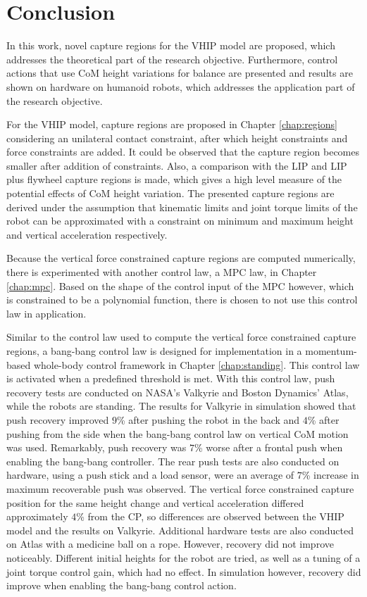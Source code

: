 %
\chapter{Conclusion}\label{chap:conclusion}
In this work, novel capture regions for the \ac{VHIP} model are proposed, which addresses the theoretical part of the research objective. Furthermore, control actions that use \ac{CoM} height variations for balance are presented and results are shown on hardware on humanoid robots, which addresses the application part of the research objective. 

For the \ac{VHIP} model, capture regions are proposed in Chapter \ref{chap:regions} considering an unilateral contact constraint, after which height constraints and force constraints are added. It could be observed that the capture region becomes smaller after addition of constraints. Also, a comparison with the \ac{LIP} and \ac{LIP} plus flywheel capture regions is made, which gives a high level measure of the potential effects of \ac{CoM} height variation. The presented capture regions are derived under the assumption that kinematic limits and joint torque limits of the robot can be approximated with a constraint on minimum and maximum height and vertical acceleration respectively. 

Because the vertical force constrained capture regions are computed numerically, there is experimented with another control law, a \ac{MPC} law, in Chapter \ref{chap:mpc}. Based on the shape of the control input of the \ac{MPC} however, which is constrained to be a polynomial function, there is chosen to not use this control law in application.

Similar to the control law used to compute the vertical force constrained capture regions, a bang-bang control law is designed for implementation in a momentum-based whole-body control framework in Chapter \ref{chap:standing}. This control law is activated when a predefined threshold is met. With this control law, push recovery tests are conducted on NASA's Valkyrie and Boston Dynamics' Atlas, while the robots are standing. The results for Valkyrie in simulation showed that push recovery improved $9$\% after pushing the robot in the back and $4$\% after pushing from the side when the bang-bang control law on vertical \ac{CoM} motion was used. Remarkably, push recovery was $7$\% worse after a frontal push when enabling the bang-bang controller. The rear push tests are also conducted on hardware, using a push stick and a load sensor, were an average of $7$\% increase in maximum recoverable push was observed. The vertical force constrained capture position for the same height change and vertical acceleration differed approximately $4$\% from the \ac{CP}, so differences are observed between the \ac{VHIP} model and the results on Valkyrie. Additional hardware tests are also conducted on Atlas with a medicine ball on a rope. However, recovery did not improve noticeably. Different initial heights for the robot are tried, as well as a tuning of a joint torque control gain, which had no effect. In simulation however, recovery did improve when enabling the bang-bang control action.

